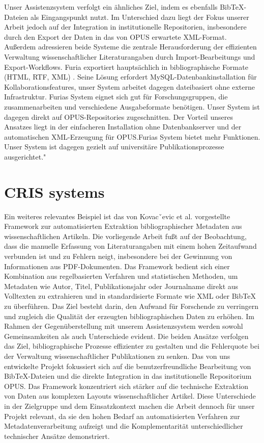 \noindent Unser Assistenzsystem verfolgt ein ähnliches Ziel, indem es ebenfalls 
Bib\TeX{}-Dateien als Eingangspunkt nutzt. Im Unterschied dazu liegt der 
Fokus unserer Arbeit jedoch auf der Integration in institutionelle 
Repositorien, insbesondere durch den Export der Daten in das von OPUS 
erwartete XML-Format. Außerdem adressieren beide Systeme die zentrale Herausforderung der
effizienten Verwaltung wissenschaftlicher Literaturangaben durch Import-Bearbeitungs und Export-Workflows.
Furia exportiert  hauptsächlich in bibliographische Formate (HTML, RTF, XML) .
Seine Lösung erfordert MySQL-Datenbankinstallation für Kollaborationsfeatures, unser System arbeitet dagegen dateibasiert
ohne externe Infrastruktur.
Furias System eignet sich gut für Forschungsgruppen, die zusammenarbeiten und verschiedene Ausgabeformate benötigen.
Unser System ist dagegen direkt auf OPUS-Repositories zugeschnitten. Der Vorteil unseres Ansatzes liegt in der einfacheren
Installation ohne Datenbankserver und der automatischen XML-Erzeugung für OPUS.Furias System bietet mehr Funktionen. 
Unser System ist dagegen  gezielt auf universitäre Publikationsprozesse ausgerichtet."

\section{CRIS systems}
Ein weiteres relevantes Beispiel ist das von Kovacˇevic et al. 
\cite{kovavcevic2011automatic} vorgestellte Framework zur automatisierten 
Extraktion bibliographischer Metadaten aus wissenschaftlichen Artikeln. 
Die vorliegende Arbeit fußt auf der Beobachtung, dass die manuelle 
Erfassung von Literaturangaben mit einem hohen Zeitaufwand verbunden 
ist und zu Fehlern neigt, insbesondere bei der Gewinnung von 
Informationen aus PDF-Dokumenten. Das Framework bedient sich 
einer Kombination aus regelbasierten Verfahren und statistischen 
Methoden, um Metadaten wie Autor, Titel, Publikationsjahr oder 
Journalname direkt aus Volltexten zu extrahieren und in standardisierte 
Formate wie XML oder BibTeX zu überführen. Das Ziel besteht darin, den 
Aufwand für Forschende zu verringern und zugleich die Qualität der 
erzeugten bibliographischen Daten zu erhöhen. Im Rahmen der 
Gegenüberstellung mit unserem Assistenzsystem werden sowohl 
Gemeinsamkeiten als auch Unterschiede evident. Die beiden Ansätze 
verfolgen das Ziel, bibliographische Prozesse effizienter zu gestalten 
und die Fehlerquote bei der Verwaltung wissenschaftlicher Publikationen 
zu senken. Das von uns entwickelte Projekt fokussiert sich auf die 
benutzerfreundliche Bearbeitung von BibTeX-Dateien und die direkte 
Integration in das institutionelle Repositorium OPUS. Das Framework 
konzentriert sich stärker auf die technische Extraktion von Daten aus 
komplexen Layouts wissenschaftlicher Artikel. Diese Unterschiede in der 
Zielgruppe und dem Einsatzkontext machen die Arbeit dennoch für unser 
Projekt relevant, da sie den hohen Bedarf an automatisierten Verfahren 
zur Metadatenverarbeitung aufzeigt und die Komplementarität unterschiedlicher 
technischer Ansätze demonstriert.